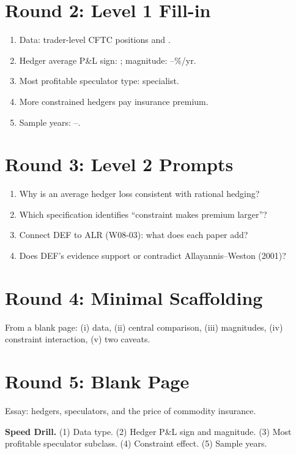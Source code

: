 \documentclass[11pt]{article}
\newcommand{\blank}[1]{\underline{\hspace{#1}}}
\begin{document}
\section*{Round 2: Level 1 Fill-in}
\begin{enumerate}
\item Data: trader-level CFTC positions and \blank{1cm}.
\item Hedger average P\&L sign: \blank{1cm}; magnitude: \blank{1cm}--\blank{1cm}\%/yr.
\item Most profitable speculator type: \blank{2cm} specialist.
\item More constrained hedgers pay \blank{1cm} insurance premium.
\item Sample years: \blank{1cm}--\blank{1cm}.
\end{enumerate}

\section*{Round 3: Level 2 Prompts}
\begin{enumerate}
\item Why is an average hedger loss consistent with rational hedging?
\item Which specification identifies ``constraint makes premium larger''?
\item Connect DEF to ALR (W08-03): what does each paper add?
\item Does DEF's evidence support or contradict Allayannis--Weston (2001)?
\end{enumerate}

\section*{Round 4: Minimal Scaffolding}
From a blank page: (i) data, (ii) central comparison, (iii) magnitudes, (iv) constraint interaction, (v) two caveats.

\section*{Round 5: Blank Page}
Essay: hedgers, speculators, and the price of commodity insurance.

\vspace{6pt}
\begin{drillbox}
\textbf{Speed Drill.} (1) Data type. (2) Hedger P\&L sign and magnitude. (3) Most profitable speculator subclass. (4) Constraint effect. (5) Sample years.
\end{drillbox}
\end{document}
